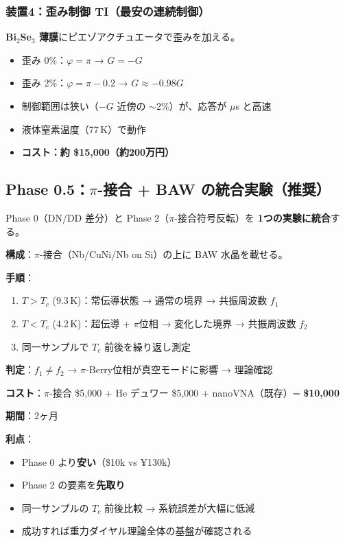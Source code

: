 \documentclass[11pt,a4paper]{article}
\begin{document}
\subsubsection{装置4：歪み制御 TI（最安の連続制御）}

\textbf{Bi$_2$Se$_3$ 薄膜}にピエゾアクチュエータで歪みを加える。
\begin{itemize}
\item 歪み 0\%：$\varphi = \pi$ → $G = -G$
\item 歪み 2\%：$\varphi = \pi - 0.2$ → $G \approx -0.98G$
\item 制御範囲は狭い（$-G$ 近傍の $\sim 2\%$）が、応答が $\mu$s と高速
\item 液体窒素温度（77\,K）で動作
\item \textbf{コスト：約 \$15,000（約200万円）}
\end{itemize}

\subsection{Phase 0.5：$\pi$-接合 + BAW の統合実験（推奨）}

\begin{tcolorbox}[colback=red!5,colframe=red!60!black,title=★ 最もシンプルな決定的実験 ★]
Phase 0（DN/DD 差分）と Phase 2（$\pi$-接合符号反転）を
\textbf{1つの実験に統合}する。

\textbf{構成}：$\pi$-接合（Nb/CuNi/Nb on Si）の上に BAW 水晶を載せる。

\textbf{手順}：
\begin{enumerate}
\item $T > T_c$ (9.3\,K)：常伝導状態 → 通常の境界 → 共振周波数 $f_1$
\item $T < T_c$ (4.2\,K)：超伝導 + $\pi$位相 → 変化した境界 → 共振周波数 $f_2$
\item 同一サンプルで $T_c$ 前後を繰り返し測定
\end{enumerate}

\textbf{判定}：$f_1 \neq f_2$ → $\pi$-Berry位相が真空モードに影響 → 理論確認

\textbf{コスト}：$\pi$-接合 \$5,000 + He デュワー \$5,000 + nanoVNA（既存）= \textbf{\$10,000}

\textbf{期間}：2ヶ月

\textbf{利点}：
\begin{itemize}
\item Phase 0 より\textbf{安い}（\$10k vs ¥130k）
\item Phase 2 の要素を\textbf{先取り}
\item 同一サンプルの $T_c$ 前後比較 → 系統誤差が大幅に低減
\item 成功すれば重力ダイヤル理論全体の基盤が確認される
\end{itemize}
\end{tcolorbox}
\end{document}
